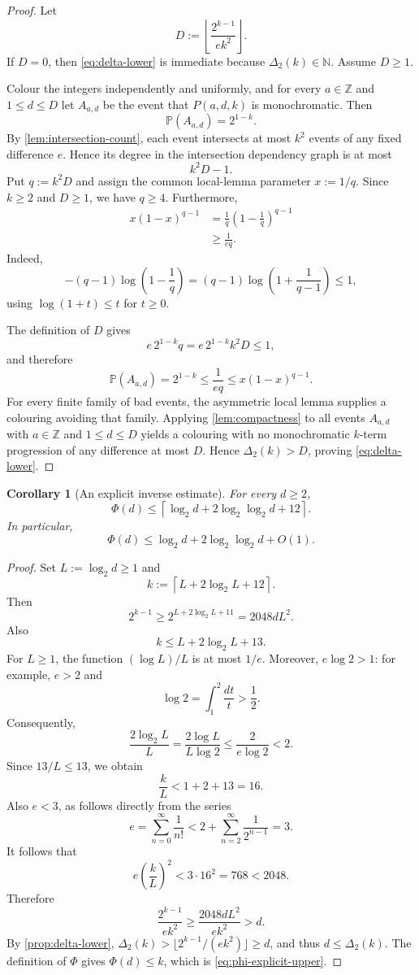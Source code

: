 \documentclass[11pt]{article}
\newtheorem{corollary}[theorem]{Corollary}
\theoremstyle{definition}
\theoremstyle{remark}
\newcommand{\N}{\mathbb N}
\newcommand{\Z}{\mathbb Z}
\newcommand{\DeltaTwo}{\Delta_{2}}
\newcommand{\PhiTwo}{\Phi}
\begin{document}
\begin{proof}
Let
\[
D:=\left\lfloor\frac{2^{k-1}}{e k^2}\right\rfloor.
\]
If $D=0$, then \eqref{eq:delta-lower} is immediate because $\DeltaTwo(k)\in\N$. Assume $D\ge1$.

Colour the integers independently and uniformly, and for every $a\in\Z$ and $1\le d\le D$ let $A_{a,d}$ be the event that $P(a,d,k)$ is monochromatic. Then
\[
\mathbb P(A_{a,d})=2^{1-k}.
\]
By \cref{lem:intersection-count}, each event intersects at most $k^2$ events of any fixed difference $e$. Hence its degree in the intersection dependency graph is at most
\[
k^2D-1.
\]
Put $q:=k^2D$ and assign the common local-lemma parameter $x:=1/q$. Since $k\ge2$ and $D\ge1$, we have $q\ge4$. Furthermore,
\begin{align*}
x(1-x)^{q-1}
&=\frac1q\left(1-\frac1q\right)^{q-1}\\
&\ge\frac1{eq}.
\end{align*}
Indeed,
\[
-(q-1)\log\left(1-\frac1q\right)
=(q-1)\log\left(1+\frac1{q-1}\right)\le1,
\]
using $\log(1+t)\le t$ for $t\ge0$.

The definition of $D$ gives
\[
e\,2^{1-k}q=e\,2^{1-k}k^2D\le1,
\]
and therefore
\[
\mathbb P(A_{a,d})=2^{1-k}
\le\frac1{eq}
\le x(1-x)^{q-1}.
\]
For every finite family of bad events, the asymmetric local lemma supplies a colouring avoiding that family. Applying \cref{lem:compactness} to all events $A_{a,d}$ with $a\in\Z$ and $1\le d\le D$ yields a colouring with no monochromatic $k$-term progression of any difference at most $D$. Hence $\DeltaTwo(k)>D$, proving \eqref{eq:delta-lower}.
\end{proof}

\begin{corollary}[An explicit inverse estimate]\label{cor:phi-upper}
For every $d\ge2$,
\begin{equation}\label{eq:phi-explicit-upper}
\PhiTwo(d)\le
\left\lceil
\log_2d+2\log_2\log_2d+12
\right\rceil.
\end{equation}
In particular,
\[
\PhiTwo(d)\le\log_2d+2\log_2\log_2d+O(1).
\]
\end{corollary}

\begin{proof}
Set $L:=\log_2d\ge1$ and
\[
k:=\left\lceil L+2\log_2L+12\right\rceil.
\]
Then
\[
2^{k-1}\ge2^{L+2\log_2L+11}=2048dL^2.
\]
Also
\[
k\le L+2\log_2L+13.
\]
For $L\ge1$, the function $(\log L)/L$ is at most $1/e$. Moreover,
$e\log2>1$: for example, $e>2$ and
\[
\log2=\int_1^2\frac{dt}{t}>\frac12.
\]
Consequently,
\[
\frac{2\log_2L}{L}
=\frac{2\log L}{L\log2}
\le\frac{2}{e\log2}<2.
\]
Since $13/L\le13$, we obtain
\[
\frac{k}{L}<1+2+13=16.
\]
Also $e<3$, as follows directly from the series
\[
e=\sum_{n=0}^{\infty}\frac1{n!}
<2+\sum_{n=2}^{\infty}\frac1{2^{n-1}}=3.
\]
It follows that
\[
e\left(\frac{k}{L}\right)^2<3\cdot16^2=768<2048.
\]
Therefore
\[
\frac{2^{k-1}}{ek^2}
\ge
\frac{2048dL^2}{ek^2}
>d.
\]
By \cref{prop:delta-lower}, $\DeltaTwo(k)>\lfloor 2^{k-1}/(ek^2)\rfloor\ge d$, and thus $d\le\DeltaTwo(k)$. The definition of $\PhiTwo$ gives $\PhiTwo(d)\le k$, which is \eqref{eq:phi-explicit-upper}.
\end{proof}
\end{document}
